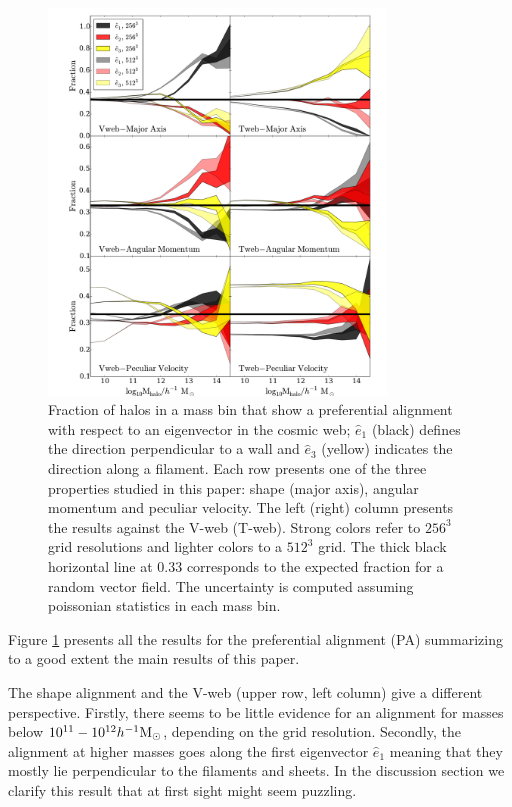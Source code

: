 \documentclass[useAMS,usenatbib]{mn2e}
\newcommand{\hMsun}{{\ifmmode{h^{-1}{\rm
        {M_{\odot}}}}\else{$h^{-1}{\rm{M_{\odot}}}$~}\fi}}
\begin{document}
\begin{figure}
\includegraphics[width=0.8\textwidth]{Fig1.pdf}
\caption{Fraction of halos in a mass bin that show a preferential
  alignment with respect to an eigenvector in the cosmic
  web; $\hat{e}_1$ (black) defines the direction perpendicular to a wall and
  $\hat{e}_3$ (yellow) indicates the direction along a filament. Each row
  presents one of the three properties studied in this paper: shape (major axis),
  angular momentum and  peculiar velocity. The left (right) column presents the
  results against the V-web (T-web). Strong colors refer to $256^3$ grid
  resolutions and lighter colors to a $512^3$ grid. The thick black
  horizontal line at $0.33$ corresponds to the expected fraction for a
  random vector field. The uncertainty is computed assuming poissonian
  statistics in each mass bin.
\label{fig:preferential}}
\end{figure}

Figure \ref{fig:preferential} presents all the results for the
preferential alignment (PA) summarizing to a good extent the main
results of this paper.

The shape alignment and the V-web (upper row, left column) give a
different perspective. Firstly, there seems to be little evidence
for an alignment for masses below $10^{11}-10^{12}\hMsun$, depending
on the grid resolution. Secondly, the alignment at higher masses goes
along the first eigenvector $\hat{e}_{1}$ meaning that they mostly lie
perpendicular to the filaments and sheets. In the discussion section
we clarify this result that at first sight might seem puzzling.
\end{document}
